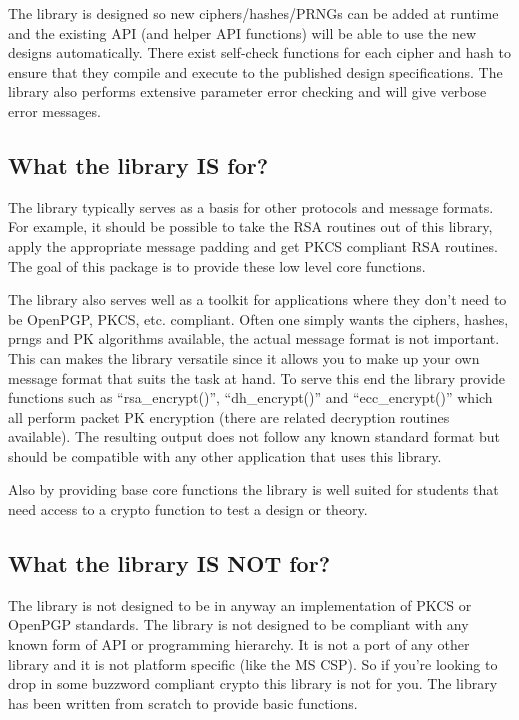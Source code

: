 \documentclass{book}
\begin{document}
The library is designed so new ciphers/hashes/PRNGs can be added at runtime and the existing API (and helper API functions) will 
be able to use the new designs automatically.  There exist self-check functions for each cipher and hash to ensure that
they compile and execute to the published design specifications.  The library also performs extensive parameter error checking
and will give verbose error messages.

\subsection{What the library {\bf IS} for?}

The library typically serves as a basis for other protocols and message formats.  For example, it should be possible to 
take the RSA routines out of this library, apply the appropriate message padding and get PKCS compliant RSA routines.  The
goal of this package is to provide these low level core functions.  

The library also serves well as a toolkit for applications where they don't need to be OpenPGP, PKCS, etc. compliant.
Often one simply wants the ciphers, hashes, prngs and PK algorithms available, the actual message format is not important.  
This can makes the library versatile since it allows you to make up your own message format that suits the task at hand.  
To serve this end the library provide functions such as ``rsa\_encrypt()'', ``dh\_encrypt()'' and ``ecc\_encrypt()'' which 
all perform packet PK encryption (there are related decryption routines available).  The resulting output does not follow
any known standard format but should be compatible with any other application that uses this library.

Also by providing base core functions the library is well suited for students that need access to a crypto function 
to test a design or theory.

\subsection{What the library IS NOT for?}

The library is not designed to be in anyway an implementation of PKCS or OpenPGP standards.  The library is not designed 
to be compliant with any known form of API or programming hierarchy.  It is not a port of any other library and it is not
platform specific (like the MS CSP).  So if you're looking to drop in some buzzword compliant crypto this library is not
for you.  The library has been written from scratch to provide basic functions.
\end{document}
